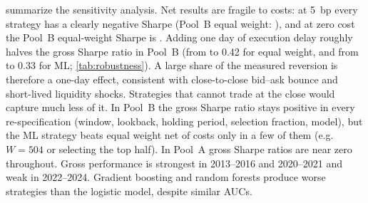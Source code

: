  summarize the sensitivity analysis.
Net results are fragile to costs: at 5~bp every strategy has a clearly
negative Sharpe (Pool~B equal weight: \SRCostFiveEWB), and at zero cost
the Pool~B equal-weight Sharpe is \SRCostZeroEWB. Adding one day of
execution delay roughly halves the gross Sharpe ratio in Pool~B (from
\GSREWB{} to 0.42 for equal weight, and from \GSRMLAllB{} to 0.33 for
ML; \cref{tab:robustness}). A large share of the measured reversion is
therefore a one-day effect, consistent with close-to-close bid--ask bounce and
short-lived liquidity shocks. Strategies that cannot trade at the
close would capture much less of it. In Pool~B the gross Sharpe ratio stays positive in every
re-specification (window, lookback, holding period, selection fraction,
model), but the ML strategy beats equal weight net of costs only in a
few of them (e.g.\ $W=504$ or selecting the top half). In Pool~A gross
Sharpe ratios are near zero throughout. Gross performance is strongest
in 2013--2016 and 2020--2021 and weak in 2022--2024. Gradient boosting
and random forests produce worse strategies than the logistic model,
despite similar AUCs.
